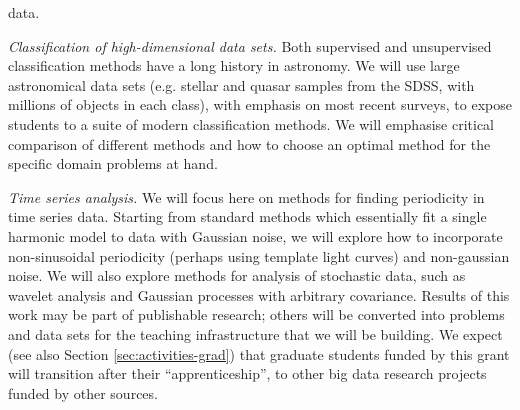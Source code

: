   data.
\item {\em Classification of high-dimensional data sets.} 
Both supervised and unsupervised classification methods have a long
history in astronomy. We will use large astronomical data sets (e.g. 
stellar and quasar samples from the SDSS, with millions of objects in
each class), with emphasis on most recent surveys, to expose students
to a suite of modern classification methods. We will emphasise critical
comparison of different methods and how to choose an optimal method
for the specific domain problems at hand.
\item {\em Time series analysis.} 
We will focus here on methods for finding periodicity in time series 
data. Starting from standard methods which essentially fit a single 
harmonic model to data with Gaussian noise, we will explore how
to incorporate non-sinusoidal periodicity (perhaps using template 
light curves) and non-gaussian noise. We will also explore methods 
for analysis of stochastic data, such as wavelet analysis and Gaussian
processes with arbitrary covariance.
\eits
%
Results of this work may be part of publishable research; others will
be converted into problems and data sets for the teaching
infrastructure that we will be building. We expect (see also Section
\ref{sec:activities-grad}) that graduate students funded by this grant
will transition after their ``apprenticeship'', to other big data
research projects funded by other sources. 
